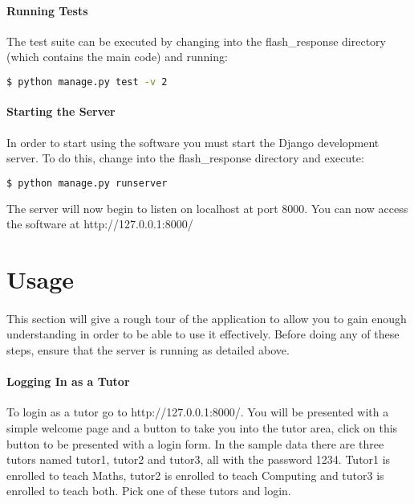 \documentclass[10pt]{report}
\begin{document}
    \paragraph{Running Tests}
    The test suite can be executed by changing into the flash\_response directory (which contains the main
    code) and running:
    \begin{lstlisting}[language=bash]
    	$ python manage.py test -v 2
    \end{lstlisting}
    
    \paragraph{Starting the Server}
    In order to start using the software you must start the Django development server.  To do this, change
    into the flash\_response directory and execute:
    \begin{lstlisting}[language=bash]
    	$ python manage.py runserver
    \end{lstlisting}
    The server will now begin to listen on localhost at port 8000.  You can now access the software at 
    http://127.0.0.1:8000/
    
    \section*{Usage}
    \paragraph{}
    This section will give a rough tour of the application to allow you to gain enough understanding in
    order to be able to use it effectively.  Before doing any of these steps, ensure that the server is
    running as detailed above.
    
    \paragraph*{Logging In as a Tutor}
    To login as a tutor go to http://127.0.0.1:8000/.  You will be presented with a simple welcome page
    and a button to take you into the tutor area, click on this button to be presented with a login form.
    In the sample data there are three tutors named tutor1, tutor2 and tutor3, all with the password 1234. 
    Tutor1 is enrolled to teach Maths, tutor2 is enrolled to teach Computing and tutor3 is enrolled to
    teach both.  Pick one of these tutors and login.
    
\end{document}
